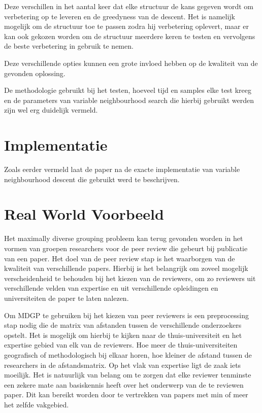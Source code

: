 \documentclass[pdftex,12pt,a4paper]{article}
\begin{document}
Deze verschillen in het aantal keer dat elke structuur de kans gegeven wordt om verbetering op te leveren en de greedyness van de descent. Het is namelijk mogelijk om de structuur toe te passen zodra hij verbetering oplevert, maar er kan ook gekozen worden om de structuur meerdere keren te testen en vervolgens de beste verbetering in gebruik te nemen.

Deze verschillende opties kunnen een grote invloed hebben op de kwaliteit van de gevonden oplossing.

De methodologie gebruikt bij het testen, hoeveel tijd en samples elke test kreeg en de parameters van variable neighbourhood search die hierbij gebruikt werden zijn wel erg duidelijk vermeld.

\section{Implementatie}
Zoals eerder vermeld laat de paper na de exacte implementatie van variable neighbourhood descent die gebruikt werd te beschrijven. 

\section{Real World Voorbeeld}

Het maximally diverse grouping probleem kan terug gevonden worden in het vormen van groepen researchers voor de peer review die gebeurt bij publicatie van een paper. Het doel van de peer review stap is het waarborgen van de kwaliteit van verschillende papers. Hierbij is het belangrijk om zoveel mogelijk verscheidenheid te behouden bij het kiezen van de reviewers, om zo reviewers uit verschillende velden van expertise en uit verschillende opleidingen en universiteiten de paper te laten nalezen.

Om MDGP te gebruiken bij het kiezen van peer reviewers is een preprocessing stap nodig die de matrix van afstanden tussen de verschillende onderzoekers opstelt. Het is mogelijk om hierbij te kijken naar de thuis-universiteit en het expertise gebied van elk van de reviewers. Hoe meer de thuis-universiteiten geografisch of methodologisch bij elkaar horen, hoe kleiner de afstand tussen de researchers in de afstandsmatrix. Op het vlak van expertise ligt de zaak iets moeilijk. Het is natuurlijk van belang om te zorgen dat elke reviewer tenminste een zekere mate aan basiskennis heeft over het onderwerp van de te reviewen paper. Dit kan bereikt worden door te vertrekken van papers met min of meer het zelfde vakgebied.
\end{document}
